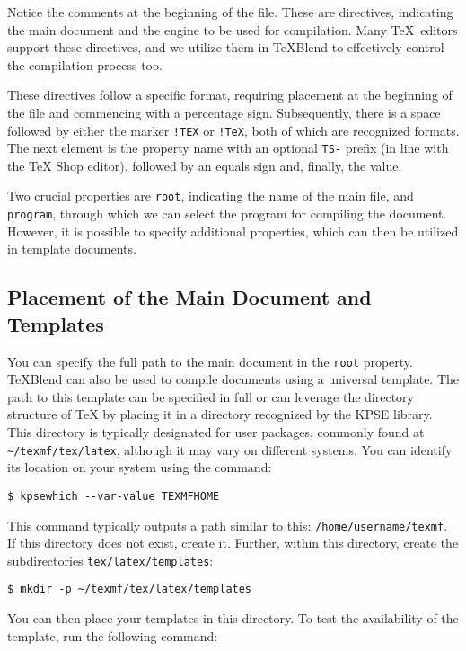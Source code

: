 Notice the comments at the beginning of the file. These are
directives, indicating the main document and the engine to be used for
compilation. Many \TeX\ editors support these directives, and we utilize them in
\TeX Blend to effectively control the compilation process too.

These directives follow a specific format, requiring placement at the beginning
of the file and commencing with a percentage sign. Subsequently, there is a
space followed by either the marker \texttt{!TEX} or \texttt{!TeX}, 
both of which are recognized formats. 
The next element is the property name with an optional \texttt{TS-} prefix 
(in line with the TeX Shop editor), followed by an equals sign and, finally, the
value.

Two crucial properties are \texttt{root}, indicating the name of the main file, and
\texttt{program}, through which we can select the program for compiling the document.
However, it is possible to specify additional properties, which can then be
utilized in template documents.

\subsection{Placement of the Main Document and Templates}
\label{sec:placement}

You can specify the full path to the main document in the \verb|root| property.
\TeX Blend can also be used to compile documents using a universal template. 
The path to this template can be specified in full or can leverage the directory
structure of TeX by placing it in a directory recognized by the KPSE library.
This directory is typically designated for user packages, commonly found at
\verb|~/texmf/tex/latex|, although it may vary on different systems. 
You can identify its location on your system using the command:

\begin{verbatim}
$ kpsewhich --var-value TEXMFHOME
\end{verbatim}

This command typically outputs a path similar to this: \texttt{/home/username/texmf}.
If this directory does not exist, create it. Further, within this directory,
create the subdirectories \texttt{tex/latex/templates}:

\begin{verbatim}
$ mkdir -p ~/texmf/tex/latex/templates
\end{verbatim}

You can then place your templates in this directory. 
To test the availability of the template, run the following command:

